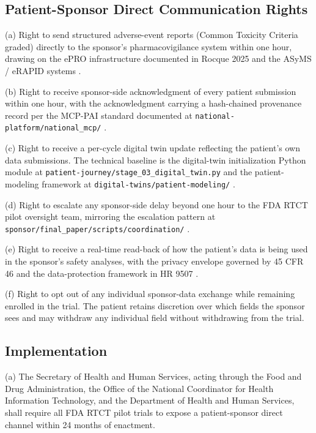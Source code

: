 \subsection{Patient-Sponsor Direct Communication Rights}

(a) Right to send structured adverse-event reports (Common Toxicity
Criteria graded) directly to the sponsor's pharmacovigilance system
within one hour, drawing on the ePRO infrastructure documented in
Rocque 2025 and the ASyMS / eRAPID systems
\cite{rocque2025remote_symptom_monitoring, kearney2009asyms,
maguire2017esmart, absolom2021erapid}.

(b) Right to receive sponsor-side acknowledgment of every patient
submission within one hour, with the acknowledgment carrying a
hash-chained provenance record per the MCP-PAI standard documented
at \texttt{national-platform/national\_mcp/}
\cite{kawchak_2026_19244918}.

(c) Right to receive a per-cycle digital twin update reflecting
the patient's own data submissions. The technical baseline is the
digital-twin initialization Python module at
\texttt{patient-journey/stage\_03\_digital\_twin.py} and the
patient-modeling framework at
\texttt{digital-twins/patient-modeling/}
\cite{kawchak_2026_19119939}.

(d) Right to escalate any sponsor-side delay beyond one hour to
the FDA RTCT pilot oversight team, mirroring the escalation
pattern at \texttt{sponsor/final\_paper/scripts/coordination/}
\cite{kawchak_2026_19396256}.

(e) Right to receive a real-time read-back of how the patient's
data is being used in the sponsor's safety analyses, with the
privacy envelope governed by 45 CFR 46 and the data-protection
framework in HR 9507 \cite{hhs_45cfr46_protection_human_subjects}.

(f) Right to opt out of any individual sponsor-data exchange while
remaining enrolled in the trial. The patient retains discretion
over which fields the sponsor sees and may withdraw any individual
field without withdrawing from the trial.

\subsection{Implementation}

(a) The Secretary of Health and Human Services, acting through the
Food and Drug Administration, the Office of the National
Coordinator for Health Information Technology, and the Department
of Health and Human Services, shall require all FDA RTCT pilot
trials to expose a patient-sponsor direct channel within 24 months
of enactment.

